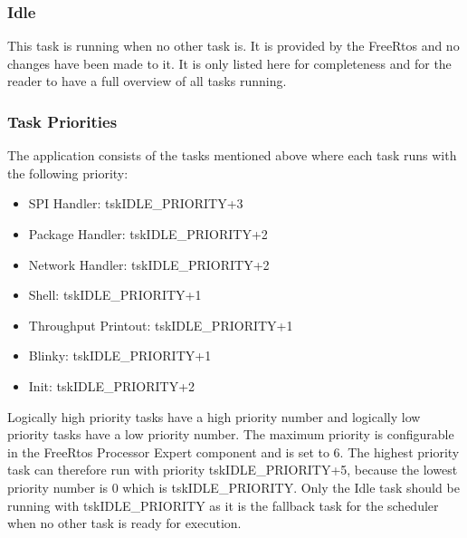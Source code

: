 \subsubsection{Idle}
This task is running when no other task is. It is provided by the FreeRtos and no changes have been made to it. It is only listed here for completeness and for the reader to have a full overview of all tasks running.
%
\subsubsection{Task Priorities} \label{subsec:txtTaskPriorities}
The application consists of the tasks mentioned above where each task runs with the following priority:
\begin{itemize}
    \item SPI Handler:			\tab tskIDLE\_PRIORITY+3
    \item Package Handler:		\tab tskIDLE\_PRIORITY+2
    \item Network Handler:		\tab tskIDLE\_PRIORITY+2
    \item Shell:				\tab tskIDLE\_PRIORITY+1
    \item Throughput Printout:	\tab tskIDLE\_PRIORITY+1
    \item Blinky:				\tab tskIDLE\_PRIORITY+1
    \item Init:					\tab tskIDLE\_PRIORITY+2
\end{itemize}
Logically high priority tasks have a high priority number and logically low priority tasks have a low priority number. The maximum priority is configurable in the FreeRtos Processor Expert component and is set to 6. The highest priority task can therefore run with priority tskIDLE\_PRIORITY+5, because the lowest priority number is 0 which is tskIDLE\_PRIORITY. Only the Idle task should be running with tskIDLE\_PRIORITY as it is the fallback task for the scheduler when no other task is ready for execution.
%
